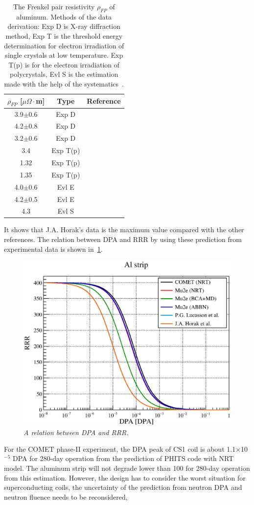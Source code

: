 \begin{table}[H]
 \centering
 \begin{tabular}{ccc} \hline \hline
  $\rho_{FP}$ [$\mu\Omega\cdot$m] & Type & Reference \\ \hline
  3.9$\pm$0.6 & Exp D & \cite{erh1} \\
  4.2$\pm$0.8 & Exp D & \cite{erh2} \\
  3.2$\pm$0.6 & Exp D & \cite{rober} \\
  3.4 & Exp T(p) & \cite{ref1} \\
  1.32 & Exp T(p) & \cite{ref2} \\
  1.35 & Exp T(p) & \cite{ref3} \\
  4.0$\pm$0.6 & Evl E & \cite{ref4} \\
  4.2$\pm$0.5 & Evl E & \cite{ref5} \\
  4.3 & Evl S & \cite{ref6} \\ \hline \hline
 \end{tabular}
 \caption{The Frenkel pair resistivity $\rho_{FP}$ of aluminum. Methods of the data derivation: Exp D is X-ray diffraction method, Exp T is the threshold energy determination for electron irradiation of single crystals at low temperature. Exp T(p) is for the electron irradiation of polycrystals, Evl S is the estimation made with the help of the systematics~\cite{yu}.}
 \label{frank}
\end{table}
It shows that J.A. Horak's data is the maximum value compared with the other references.
The relation between DPA and RRR by using these prediction from experimental data is shown in~\ref{dpaaa}.
\begin{figure}[H]
 \centering
 \includegraphics[scale=0.45]{chapter4/fig/dpadegradation.eps}
 \caption{\it A relation between DPA and RRR.}
 \label{dpaaa}
\end{figure}
For the COMET phase-II experiment, the DPA peak of CS1 coil is about 1.1$\times$10$^{-5}$ DPA for 280-day operation from the prediction of PHITS code with NRT model.
The aluminum strip will not degrade lower than 100 for 280-day operation from this estimation.
However, the design has to consider the worst situation for superconducting coils, the uncertainty of the prediction from neutron DPA and neutron fluence needs to be reconsidered,

